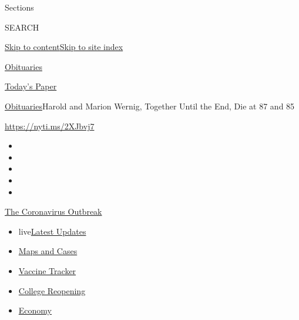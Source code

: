Sections

SEARCH

\protect\hyperlink{site-content}{Skip to
content}\protect\hyperlink{site-index}{Skip to site index}

\href{https://www.nytimes.com/section/obituaries}{Obituaries}

\href{https://myaccount.nytimes.com/auth/login?response_type=cookie\&client_id=vi}{}

\href{https://www.nytimes.com/section/todayspaper}{Today's Paper}

\href{/section/obituaries}{Obituaries}\textbar{}Harold and Marion
Wernig, Together Until the End, Die at 87 and 85

\url{https://nyti.ms/2XJbvj7}

\begin{itemize}
\item
\item
\item
\item
\item
\end{itemize}

\href{https://www.nytimes.com/news-event/coronavirus?action=click\&pgtype=Article\&state=default\&region=TOP_BANNER\&context=storylines_menu}{The
Coronavirus Outbreak}

\begin{itemize}
\tightlist
\item
  live\href{https://www.nytimes.com/2020/08/03/world/coronavirus-covid-19.html?action=click\&pgtype=Article\&state=default\&region=TOP_BANNER\&context=storylines_menu}{Latest
  Updates}
\item
  \href{https://www.nytimes.com/interactive/2020/us/coronavirus-us-cases.html?action=click\&pgtype=Article\&state=default\&region=TOP_BANNER\&context=storylines_menu}{Maps
  and Cases}
\item
  \href{https://www.nytimes.com/interactive/2020/science/coronavirus-vaccine-tracker.html?action=click\&pgtype=Article\&state=default\&region=TOP_BANNER\&context=storylines_menu}{Vaccine
  Tracker}
\item
  \href{https://www.nytimes.com/2020/08/02/us/covid-college-reopening.html?action=click\&pgtype=Article\&state=default\&region=TOP_BANNER\&context=storylines_menu}{College
  Reopening}
\item
  \href{https://www.nytimes.com/live/2020/08/03/business/stock-market-today-coronavirus?action=click\&pgtype=Article\&state=default\&region=TOP_BANNER\&context=storylines_menu}{Economy}
\end{itemize}

